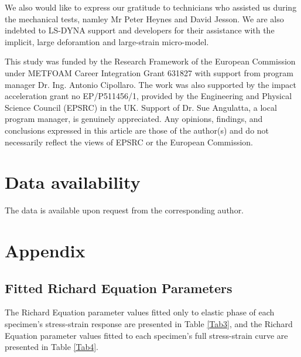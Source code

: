 \documentclass[review]{elsarticle}
\begin{document}
{We also would like to express our gratitude to technicians who assisted us during the mechanical tests, namley Mr Peter Heynes and David Jesson. We are also indebted to LS-DYNA support and developers for their assistance with the implicit, large deforamtion and large-strain micro-model.

This study was funded by the Research Framework of the European Commission under METFOAM Career Integration Grant 631827 with support from program manager Dr. Ing. Antonio Cipollaro. The work was also supported by the impact acceleration grant no EP/P511456/1, provided by the Engineering and Physical Science Council (EPSRC) in the UK. Support of Dr. Sue Angulatta, a local program manager, is genuinely appreciated. Any opinions, findings, and conclusions expressed in this article are those of the author(s) and do not necessarily reflect the views of EPSRC or the European Commission.


\section*{Data availability}

The data is available upon request from the corresponding author.



\section*{Appendix}

\subsection*{Fitted Richard Equation Parameters}

The Richard Equation parameter values fitted only to elastic phase of each specimen’s stress-strain response are presented in Table \ref{Tab3}, and the Richard Equation parameter values fitted to each specimen’s full stress-strain curve are presented in Table \ref{Tab4}.

\begin{landscape}



\end{landscape}}
\end{document}
